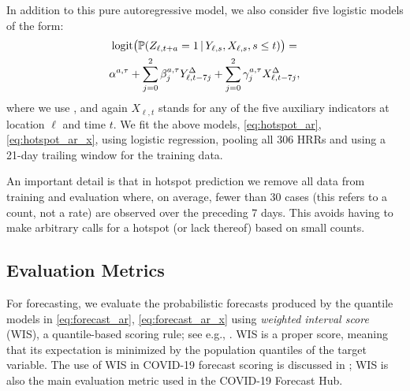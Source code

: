 \documentclass[9pt,twocolumn,twoside,lineno]{pnas-new}
\begin{document}
In addition to this pure autoregressive model, we also consider five
logistic models of the form:  
\begin{multline}
\label{eq:hotspot_ar_x}
\mathrm{logit} \big( \mathbb{P}(Z_{\ell,t+a} = 1 \,|\, Y_{\ell,s}, X_{\ell,s}, s \leq t) \big)
= \\ \alpha^{a,\tau} + \sum_{j=0}^2 \beta^{a,\tau}_j Y^\Delta_{\ell,t-7j} +  
\sum_{j=0}^2 \gamma^{a,\tau}_j X^\Delta_{\ell,t-7j},
\end{multline}
where we use , and again $X_{\ell,t}$ stands for any of the five  
auxiliary indicators at location $\ell$ and time $t$.  We fit the above models,
\eqref{eq:hotspot_ar}, \eqref{eq:hotspot_ar_x}, using logistic regression,   
pooling all 306 HRRs and using a 21-day trailing window for the training data.   

An important detail is that in hotspot prediction we remove all data from
training and evaluation where, on average, fewer than 30 cases (this refers to a
count, not a rate) are observed over the preceding 7 days. This avoids having to
make arbitrary calls for a hotspot (or lack thereof) based on small counts.   

\subsection{Evaluation Metrics}

For forecasting, we evaluate the probabilistic forecasts produced by the
quantile models in \eqref{eq:forecast_ar}, \eqref{eq:forecast_ar_x} using 
\textit{weighted interval score} (WIS), a quantile-based scoring rule; see e.g.,
\cite{Gneiting:2007}.  WIS is a proper score, meaning that its expectation
is minimized by the population quantiles of the target variable.  The use of WIS
in COVID-19 forecast scoring is discussed in \cite{Bracher:2021}; WIS is also
the main evaluation metric used in the COVID-19 Forecast Hub.
\end{document}
